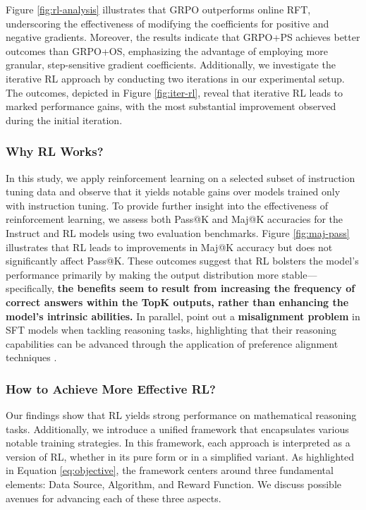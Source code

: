\begin{itemize}[topsep=0pt]
Figure \ref{fig:rl-analysis} illustrates that GRPO outperforms online RFT, underscoring the effectiveness of modifying the coefficients for positive and negative gradients. Moreover, the results indicate that GRPO+PS achieves better outcomes than GRPO+OS, emphasizing the advantage of employing more granular, step-sensitive gradient coefficients. Additionally, we investigate the iterative RL approach by conducting two iterations in our experimental setup. The outcomes, depicted in Figure \ref{fig:iter-rl}, reveal that iterative RL leads to marked performance gains, with the most substantial improvement observed during the initial iteration.

\subsubsection{Why RL Works?} In this study, we apply reinforcement learning on a selected subset of instruction tuning data and observe that it yields notable gains over models trained only with instruction tuning. To provide further insight into the effectiveness of reinforcement learning, we assess both Pass@K and Maj@K accuracies for the Instruct and RL models using two evaluation benchmarks. Figure \ref{fig:maj-pass} illustrates that RL leads to improvements in Maj@K accuracy but does not significantly affect Pass@K. These outcomes suggest that RL bolsters the model’s performance primarily by making the output distribution more stable—specifically, \textbf{the benefits seem to result from increasing the frequency of correct answers within the TopK outputs, rather than enhancing the model’s intrinsic abilities.} In parallel, \citep{wang2023making} point out a \textbf{misalignment problem} in SFT models when tackling reasoning tasks, highlighting that their reasoning capabilities can be advanced through the application of preference alignment techniques \citep{yuan2023rrhf,song2023preference,wang2023making}.

\subsubsection{How to Achieve More Effective RL?}
\label{sec:effec_rl}
Our findings show that RL yields strong performance on mathematical reasoning tasks. Additionally, we introduce a unified framework that encapsulates various notable training strategies. In this framework, each approach is interpreted as a version of RL, whether in its pure form or in a simplified variant. As highlighted in Equation \ref{eq:objective}, the framework centers around three fundamental elements: Data Source, Algorithm, and Reward Function. We discuss possible avenues for advancing each of these three aspects.


\end{itemize}
